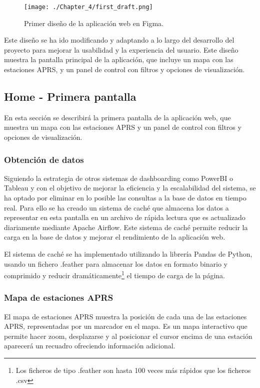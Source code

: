 \begin{figure}[h]
	\centering
	\texttt{[image: ./Chapter\_4/first\_draft.png]}
	\caption{Primer diseño de la aplicación web en Figma.}
	\label{fig:figma}
\end{figure}

Este diseño se ha ido modificando y adaptando a lo largo del desarrollo del proyecto para mejorar la usabilidad y la experiencia del usuario. Este diseño muestra la pantalla principal de la aplicación, que incluye un mapa con las estaciones APRS, y un panel de control con filtros y opciones de visualización.

\subsection{Home - Primera pantalla}
En esta sección se describirá la primera pantalla de la aplicación web, que muestra un mapa con las estaciones APRS y un panel de control con filtros y opciones de visualización. 
\subsubsection{Obtención de datos}

Siguiendo la estrategia de otros sistemas de dashboarding como PowerBI o Tableau y con el objetivo de mejorar la eficiencia y la escalabilidad del sistema, se ha optado por eliminar en lo posible las consultas a la base de datos en tiempo real. Para ello se ha creado un sistema de caché que almacena los datos a representar en esta pantalla en un archivo de rápida lectura que es actualizado diariamente mediante Apache Airflow. Este sistema de caché permite reducir la carga en la base de datos y mejorar el rendimiento de la aplicación web. 

El sistema de caché se ha implementado utilizando la librería Pandas de Python, usando un fichero .feather para almacenar los datos en formato binario y comprimido y reducir dramáticamente\footnote{Los ficheros de tipo .feather son hasta 100 veces más rápidos que los ficheros .csv} el tiempo de carga de la página.

\subsubsection{Mapa de estaciones APRS}

El mapa de estaciones APRS muestra la posición de cada una de las estaciones APRS, representadas por un marcador en el mapa. Es un mapa interactivo que permite hacer zoom, desplazarse y al posicionar el cursor encima de una estación aparecerá un recuadro ofreciendo información adicional.

